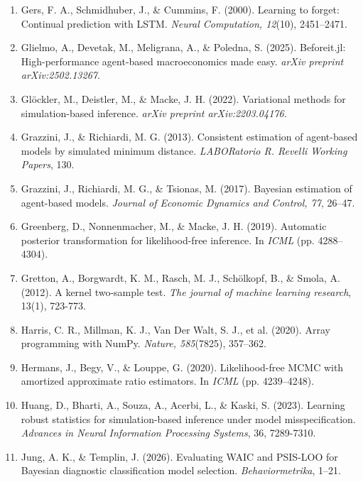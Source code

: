 \documentclass[12pt]{article}
\begin{document}
\begin{enumerate}
\item Gers, F. A., Schmidhuber, J., \& Cummins, F. (2000). Learning to forget: Continual prediction with LSTM. \textit{Neural Computation, 12}(10), 2451--2471.

\item Glielmo, A., Devetak, M., Meligrana, A., \& Poledna, S. (2025). Beforeit.jl: High-performance agent-based macroeconomics made easy. \textit{arXiv preprint arXiv:2502.13267}.

\item Glöckler, M., Deistler, M., \& Macke, J. H. (2022). Variational methods for simulation-based inference. \textit{arXiv preprint arXiv:2203.04176.}

\item Grazzini, J., \& Richiardi, M. G. (2013). Consistent estimation of agent-based models by simulated minimum distance. \textit{LABORatorio R. Revelli Working Papers}, 130.

\item Grazzini, J., Richiardi, M. G., \& Tsionas, M. (2017). Bayesian estimation of agent-based models. \textit{Journal of Economic Dynamics and Control, 77}, 26--47.

\item Greenberg, D., Nonnenmacher, M., \& Macke, J. H. (2019). Automatic posterior transformation for likelihood-free inference. In \textit{ICML} (pp. 4288--4304).

\item Gretton, A., Borgwardt, K. M., Rasch, M. J., Schölkopf, B., \& Smola, A. (2012). A kernel two-sample test. \textit{The journal of machine learning research}, 13(1), 723-773.

\item Harris, C. R., Millman, K. J., Van Der Walt, S. J., et al. (2020). Array programming with NumPy. \textit{Nature, 585}(7825), 357--362.

\item Hermans, J., Begy, V., \& Louppe, G. (2020). Likelihood-free MCMC with amortized approximate ratio estimators. In \textit{ICML} (pp. 4239--4248).

\item Huang, D., Bharti, A., Souza, A., Acerbi, L., \& Kaski, S. (2023). Learning robust statistics for simulation-based inference under model misspecification. \textit{Advances in Neural Information Processing Systems}, 36, 7289-7310.

\item Jung, A. K., \& Templin, J. (2026). Evaluating WAIC and PSIS-LOO for Bayesian diagnostic classification model selection. \textit{Behaviormetrika}, 1--21.


\end{enumerate}
\end{document}
